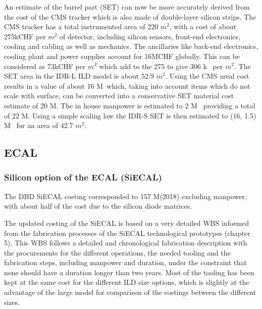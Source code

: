 An estimate of the barrel part (SET) can now be more accurately derived from the cost of the CMS tracker which is also made of double-layer silicon strips. The CMS tracker has a total instrumented area of 220 $m^2$, with a cost of about 275kCHF per $m^2$ of detector, including silicon sensors, front-end electronics, cooling and cabling as well as mechanics. The ancillaries like back-end electronics, cooling plant and power supplies account for 16MCHF globally. This can be considered  as 73kCHF per $m^2$ which add to the 275 to give 306 k\texteuro~ per $m^2$.
The SET area in the IDR-L ILD model is about 52.9 $m^2$. Using the CMS areal cost results in a value of about 16 M\texteuro~which, taking into account items which do not scale with surface, can be converted into a conservative SET material cost estimate of 20 M\texteuro. The in house manpower is estimated to 2 M\texteuro~ providing a total of 22 M\texteuro.
Using a simple scaling law the IDR-S SET is then estimated to (16, 1.5) M\texteuro~ for an area of 42.7 $m^2$. 

\subsection{ECAL}
\subsubsection{Silicon option of the ECAL (SiECAL)}
The DBD SiECAL costing corresponded to 157 M\texteuro(2018) excluding manpower, with about half of the cost due to the silicon diode matrices.

The updated costing of the SiECAL is based on a very detailed WBS informed from the fabrication processes of the SiECAL technological prototypes (chapter 5). This WBS follows a detailed and chronological fabrication description with the procurements for the different operations, the needed tooling and the fabrication steps, including manpower and duration, under the constraint that none should have a duration longer than two years. Most of the tooling has been kept at the same cost for the different ILD size options, which is slightly at the advantage of the large model for comparison of the costings between the different sizes.

